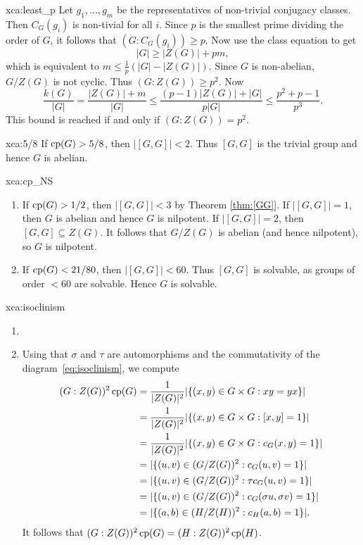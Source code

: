 \begin{sol}{xca:least_p}
Let $g_1,\dots,g_m$ be the representatives of non-trivial conjugacy classes. Then $C_G(g_i)$ is non-tivial for all $i$. Since $p$ is the smallest prime dividing the order of $G$, it follows that
$(G:C_G(g_i))\geq p$. Now use the class equation to get
\[
|G|\geq |Z(G)|+pm,
\]
which is equivalent to $m\leq \frac1p (|G|-|Z(G)|)$. Since $G$ is non-abelian, $G/Z(G)$ is not cyclic. Thus $(G:Z(G))\geq p^2$. Now 
\[
\frac{k(G)}{|G|}=\frac{|Z(G)|+m}{|G|}\leq \frac{(p-1)|Z(G)|+|G|}{p|G|}\leq \frac{p^2+p-1}{p^3}.
\]
This bound is reached if and only if $(G:Z(G))=p^2$.  
\end{sol}


\begin{sol}{xca:5/8}
    If $\operatorname{cp}(G)>5/8$, then $|[G,G]|<2$. Thus $[G,G]$ is the trivial group
    and hence $G$ is abelian. 
\end{sol}

\begin{sol}{xca:cp_NS}
\begin{enumerate}
    \item If $\operatorname{cp}(G)>1/2$, then $|[G,G]|<3$ by Theorem \ref{thm:[GG]}. If $|[G,G]|=1$, 
    then $G$ is abelian and hence $G$ is nilpotent. If $|[G,G]|=2$, then 
    $[G,G]\subseteq Z(G)$. 
    It follows that 
    $G/Z(G)$ is abelian (and hence nilpotent), so $G$ is nilpotent. 
    \item If $\operatorname{cp}(G)<21/80$, then 
    $|[G,G]|<60$. Thus $[G,G]$ is solvable, as groups of order $<60$ are solvable. 
    Hence $G$ is solvable. 
\end{enumerate}
\end{sol}


\begin{sol}{xca:isoclinism}
\begin{enumerate}
    \item 
    \item Using that $\sigma$ and 
    $\tau$ are automorphisms and 
    the commutativity of the diagram~\eqref{eq:isoclinism}, 
    we compute 
    \begin{align*}
        (G:Z(G))^2\operatorname{cp}(G) &= \frac{1}{|Z(G)|^2}|\{(x,y)\in G\times G:xy=yx\}|\\
        &=\frac{1}{|Z(G)|^2}|\{(x,y)\in G\times G:[x,y]=1\}|\\
        &=\frac{1}{|Z(G)|^2}|\{(x,y)\in G\times G:c_G(x,y)=1\}|\\
        &=|\{(u,v)\in (G/Z(G))^2:c_G(u,v)=1\}|\\
        &=|\{(u,v)\in (G/Z(G))^2:\tau c_G(u,v)=1\}|\\
        &=|\{(u,v)\in (G/Z(G))^2:c_G(\sigma u,\sigma v)=1\}|\\
        &=|\{(a,b)\in (H/Z(H))^2:c_H(a,b)=1\}|.
    \end{align*}
    It follows that $(G:Z(G))^2\operatorname{cp}(G)=(H:Z(G))^2\operatorname{cp}(H)$. 
\end{enumerate}
\end{sol}